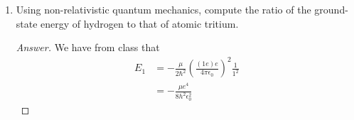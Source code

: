 \documentclass[../psets.tex]{subfiles}
\begin{document}
\begin{enumerate}
\begin{enumerate}
\begin{proof}[Answer]
            Thus,
            \begin{align*}
                \Prob(r) &= [R_{30}(r)]^2r^2\\
                &= \left[ \frac{1}{3^9a_0^3}(16\sigma^4-288\sigma^3+1728\sigma^2-3888\sigma+2916)\e[-2\sigma/3] \right](a_0\sigma)^2\\
                &= \frac{1}{3^9a_0}(16\sigma^6-288\sigma^5+1728\sigma^4-3888\sigma^3+2916\sigma^2)\e[-2\sigma/3]
            \end{align*}
            so
            \begin{align*}
                0 ={}& \dv{\Prob(r)}{r}\\
                \begin{split}
                    ={}& \frac{1}{3^9a_0}(96\sigma^5-1440\sigma^4+6912\sigma^3-11664\sigma^2+5832\sigma)\e[-2\sigma/3]\\
                    &-\frac{2}{3^{10}a_0}(16\sigma^6-288\sigma^5+1728\sigma^4-3888\sigma^3+2916\sigma^2)\e[-2\sigma/3]
                \end{split}\\
                ={}& \frac{8}{3^{10}a_0}x(-4\sigma^5+108\sigma^4-972\sigma^3+3564\sigma^2-5103\sigma+2187)\e[-2\sigma/3]\\
                ={}& -4\sigma^5+108\sigma^4-972\sigma^3+3564\sigma^2-5103\sigma+2187
            \end{align*}
            Solving this polynomial for its zeroes, and knowing that the most probable distance is going to be the zero of greatest magnitude (orbital penetration peaks will necessarily be smaller than the farthest one out), we have that the the most probable distance is
            \begin{align*}
                \sigma &= 13.074\\
                \Aboxed{r &= 13.074a_0}
            \end{align*}
        \end{proof}
    \end{enumerate}
    \item Using non-relativistic quantum mechanics, compute the ratio of the ground-state energy of hydrogen to that of atomic tritium.
    \begin{proof}[Answer]
        We have from class that
        \begin{align*}
            E_1 &= -\frac{\mu}{2\hbar^2}\left( \frac{(1e)e}{4\pi\epsilon_0} \right)^2\frac{1}{1^2}\\
            &= -\frac{\mu e^4}{8h^2\epsilon_0^2}

\end{align*}
\end{proof}
\end{enumerate}
\end{document}
